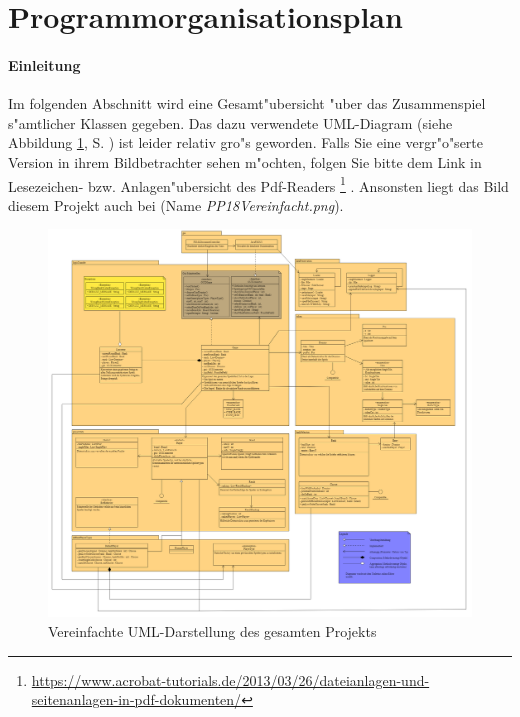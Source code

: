 \section{Programmorganisationsplan}
\paragraph{Einleitung}
Im folgenden Abschnitt wird eine Gesamt"ubersicht "uber das Zusammenspiel s"amtlicher Klassen gegeben. Das dazu verwendete UML-Diagram (siehe Abbildung \ref{fig:umlGesamtVereinfacht}, S.  \pageref{fig:umlGesamtVereinfacht}) ist leider relativ gro"s geworden. Falls Sie eine vergr"o"serte Version in ihrem Bildbetrachter sehen m"ochten, folgen Sie bitte dem Link in Lesezeichen- bzw. Anlagen"ubersicht des Pdf-Readers
\footnote{\url{https://www.acrobat-tutorials.de/2013/03/26/dateianlagen-und-seitenanlagen-in-pdf-dokumenten/}}
. Ansonsten liegt das Bild diesem Projekt auch bei (Name \emph{PP18Vereinfacht.png}). 


\begin{figure}
	\centering
	\includegraphics[width=\linewidth]{pics/PP18Vereinfacht}
	\caption{Vereinfachte UML-Darstellung des gesamten Projekts}
	\label{fig:umlGesamtVereinfacht}
\end{figure}

